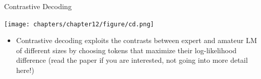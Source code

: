 
\begin{frame}{Contrastive Decoding }

\centering
\texttt{[image: chapters/chapter12/figure/cd.png]}

\begin{itemize}
    \item Contrastive decoding exploits the contrasts
between expert and amateur LM of different sizes by
choosing tokens that maximize their log-likelihood
difference (read the paper if you are interested, not going into more detail here!)
\end{itemize}


\end{frame}


\endlecture

